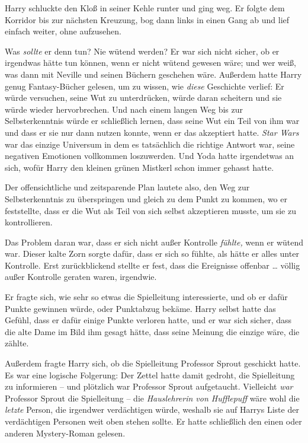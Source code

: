 {Harry schluckte den Kloß in seiner Kehle runter und ging weg. Er folgte dem Korridor bis zur nächsten Kreuzung, bog dann links in einen Gang ab und lief einfach weiter, ohne aufzusehen.

Was \emph{sollte} er denn tun? Nie wütend werden? Er war sich nicht sicher, ob er irgendwas hätte tun können, wenn er nicht wütend gewesen wäre; und wer weiß, was dann mit Neville und seinen Büchern geschehen wäre. Außerdem hatte Harry genug Fantasy-Bücher gelesen, um zu wissen, wie \emph{diese} Geschichte verlief: Er würde versuchen, seine Wut zu unterdrücken, würde daran scheitern und sie würde wieder hervorbrechen. Und nach einem langen Weg bis zur Selbsterkenntnis würde er schließlich lernen, dass seine Wut ein Teil von ihm war und dass er sie nur dann nutzen konnte, wenn er das akzeptiert hatte. \emph{Star Wars} war das einzige Universum in dem es tatsächlich die richtige Antwort war, seine negativen Emotionen vollkommen loszuwerden. Und Yoda hatte irgendetwas an sich, wofür Harry den kleinen grünen Mistkerl schon immer gehasst hatte.

Der offensichtliche und zeitsparende Plan lautete also, den Weg zur Selbsterkenntnis zu überspringen und gleich zu dem Punkt zu kommen, wo er feststellte, dass er die Wut als Teil von sich selbst akzeptieren musste, um sie zu kontrollieren.

Das Problem daran war, dass er sich nicht außer Kontrolle \emph{fühlte,} wenn er wütend war. Dieser kalte Zorn sorgte dafür, dass er sich so fühlte, als hätte er alles unter Kontrolle. Erst zurückblickend stellte er fest, dass die Ereignisse offenbar … völlig außer Kontrolle geraten waren, irgendwie.

Er fragte sich, wie sehr so etwas die Spielleitung interessierte, und ob er dafür Punkte gewinnen würde, oder Punktabzug bekäme. Harry selbst hatte das Gefühl, dass er dafür einige Punkte verloren hatte, und er war sich sicher, dass die alte Dame im Bild ihm gesagt hätte, dass seine Meinung die einzige wäre, die zählte.

Außerdem fragte Harry sich, ob die Spielleitung Professor Sprout geschickt hatte. Es war eine logische Folgerung: Der Zettel hatte damit gedroht, die Spielleitung zu informieren -- und plötzlich war Professor Sprout aufgetaucht. Vielleicht \emph{war} Professor Sprout die Spielleitung -- die \emph{Hauslehrerin von Hufflepuff} wäre wohl die \emph{letzte} Person, die irgendwer verdächtigen würde, weshalb sie auf Harrys Liste der verdächtigen Personen weit oben stehen sollte. Er hatte schließlich den einen oder anderen Mystery-Roman gelesen.

}
